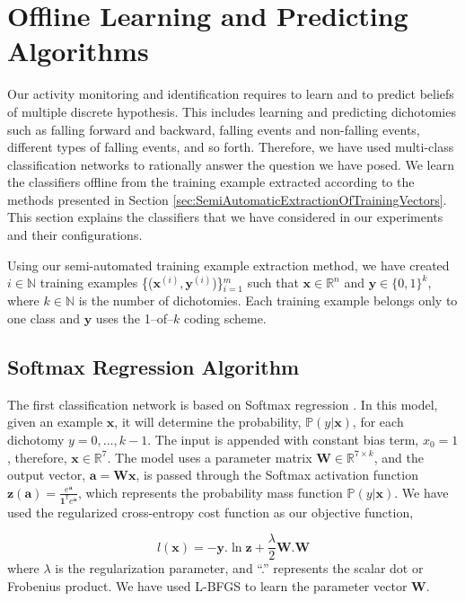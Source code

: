 \documentclass[]{IEEEtran}
\begin{document}
\section{Offline Learning and Predicting Algorithms}
\label{sec:OffLineLearning}

Our activity monitoring and identification requires to learn and to predict
beliefs of multiple discrete hypothesis. This includes learning and predicting
dichotomies such as falling forward and backward, falling events and
non-falling events, different types of falling events, and so forth.
Therefore, we have used multi-class classification networks to rationally
answer the question we have posed. We learn the classifiers offline from the
training example extracted according to the methods presented in Section
\ref{sec:SemiAutomaticExtractionOfTrainingVectors}. This section explains the
classifiers that we have considered in our experiments and their
configurations. 

Using our semi-automated training example extraction method, we have created $i \in 
\mathbb{N}$ 
training examples 
\{($\mathbf{x}^{(i)}, \mathbf{y}^{(i)}$)\}$_{i=1}^m$ such that $\mathbf{x} \in 
\mathbb{R}^{n}$ 
and 
$\mathbf{y} \in 
\{0,1\}^k$, where  $k \in 
\mathbb{N}$ is the number of dichotomies. Each training example belongs only to one class 
and $\mathbf{y}$ uses the 1--of--$k$ coding scheme.    

\subsection{Softmax Regression Algorithm}
\label{sec:SoftmaxRegrationAlgorthm}

The first classification network is based on Softmax regression
\cite{Bishop06a}. In this model, given an example $\mathbf{x}$, it will
determine the probability, $\mathbb{P}(y | \mathbf{x})$, for each dichotomy
$y=0,\ldots,k-1$. The input is appended with constant bias term, $x_0 = 1$,
therefore, $\mathbf{x} \in \mathbb{R}^7$. The model uses a parameter matrix
$\mathbf{W} \in \mathbb{R}^{7 \times k}$, and the output vector, $\mathbf{a} =
\mathbf{Wx}$, is passed through the Softmax activation function $\mathbf{z(a)}
= \frac{e^{\mathbf{a}}}{\mathbf{1}^\mathtt{T} e^{\mathbf{a}}}$, which
represents the probability mass function $\mathbb{P}(y | \mathbf{x})$. We have
used the regularized cross-entropy cost function as our objective function, 

\begin{equation} 
l(\mathbf{x}) = -\mathbf{y}.\ln \mathbf{z} + \frac{\lambda}{2} \mathbf{W}.\mathbf{W}
\label{eq:objective-function}
\end{equation}
 where  $\lambda$ is the regularization parameter, and ``.'' represents the scalar dot  
or Frobenius product.
 We have used L-BFGS \cite{DBLP:conf/icml/LeNCLPN11} to learn the 
parameter vector $\mathbf{W}$.  
\end{document}

